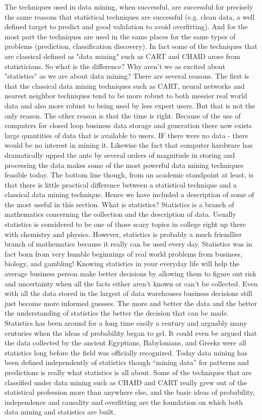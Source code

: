 The techniques used in data mining, when successful, are successful for precisely the same reasons that statistical techniques are successful (e.g. clean data, a well defined target to predict and good validation to avoid overfitting).  And for the most part the techniques are used in the same places for the same types of problems (prediction, classification discovery).  In fact some of the techniques that are classical defined as "data mining" such as CART and CHAID arose from statisticians.
So what is the difference?  Why aren't we as excited about "statistics" as we are about data mining?  There are several reasons.  The first is that the classical data mining techniques such as CART, neural networks and nearest neighbor techniques tend to be more robust to both messier real world data and also more robust to being used by less expert users.  But that is not the only reason.  The other reason is that the time is right.  Because of the use of computers for closed loop business data storage and generation there now exists large quantities of data that is available to users.  IF there were no data - there would be no interest in mining it.  Likewise the fact that computer hardware has dramatically upped the ante by several orders of magnitude in storing and processing the data makes some of the most powerful data mining techniques feasible today.
The bottom line though, from an academic standpoint at least, is that there is little practical difference between a statistical technique and a classical data mining technique.  Hence we have included a description of some of the most useful in this section.
What is statistics?
Statistics is a branch of mathematics concerning the collection and the description of data.  Usually statistics is considered to be one of those scary topics in college right up there with chemistry and physics.  However, statistics is probably a much friendlier branch of mathematics because it really can be used every day.  Statistics was in fact born from very humble beginnings of real world problems from business, biology, and gambling!
 Knowing statistics in your everyday life will help the average business person make better decisions by allowing them to figure out risk and uncertainty when all the facts either aren’t known or can’t be collected.  Even with all the data stored in the largest of data warehouses business decisions still just become more informed guesses.  The more and better the data and the better the understanding of statistics the better the decision that can be made.
Statistics has been around for a long time easily a century and arguably many centuries when the ideas of probability began to gel.  It could even be argued that the data collected by the ancient Egyptians, Babylonians, and Greeks were all statistics long before the field was officially recognized.  Today data mining has been defined independently of statistics though “mining data” for patterns and predictions is really what statistics is all about.  Some of the techniques that are classified under data mining such as CHAID and CART really grew out of the statistical profession more than anywhere else, and the basic ideas of probability, independence and causality and overfitting are the foundation on which both data mining and statistics are built.
